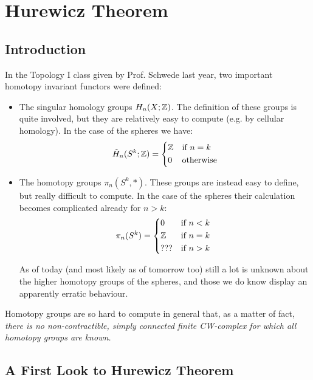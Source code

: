 
\renewcommand{\thechapter}{\Roman{chapter}}

\chapter{Hurewicz Theorem}

\section{Introduction}


In the Topology I class given by Prof. Schwede last year, two important homotopy invariant functors were defined:

\begin{itemize}
    \item The singular homology groups $H_n(X;{\mathbb Z})$. The definition of these groups is quite involved, but they are relatively easy to compute (e.g. by cellular homology). In the case of the spheres we have:
    \[\til{H}_n(S^k;\Z)=\begin{cases*}\Z & if $n=k$ \\ 0 & otherwise\end{cases*}\]
    
    \item The homotopy groups $\pi_n(S^k,*)$. These groups are instead easy to define, but really difficult to compute. In the case of the spheres their calculation becomes complicated already for $n>k$:
    \[\pi_n(S^k)=\begin{cases*}0 & if $n<k$ \\ \Z & if $n=k$ \\ ??? & if $n>k$\end{cases*}\]
    
    As of today (and most likely as of tomorrow too) still a lot is unknown about the higher homotopy groups of the spheres, and those we do know display an apparently erratic behaviour.
\end{itemize}

Homotopy groups are so hard to compute in general that, as a matter of fact, \emph{there is no non-contractible, simply connected finite CW-complex for which all homotopy groups are known.}

\section{A First Look to Hurewicz Theorem}

